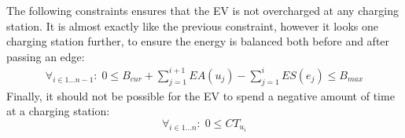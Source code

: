 The following constraints ensures that the EV is not overcharged at any charging station. It is almost exactly like the previous constraint, however it looks one charging station further, to ensure the energy is balanced both before and after passing an edge:
\begin{equation*}
\begin{aligned}
\forall_{i\in1 \dots n-1}:\;0 \leq B_{cur} + \sum_{j=1}^{i+1} EA(u_j) - \sum_{j=1}^{i} ES(e_j) \leq B_{max}
\end{aligned}
\end{equation*}
Finally, it should not be possible for the EV to spend a negative amount of time at a charging station:
\begin{equation*}
\forall_{i\in1 \dots n }:\; 0 \leq CT_{u_i}
\end{equation*}
